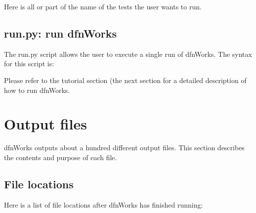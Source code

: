 \documentclass[letterpaper,10pt,english]{sphinxmanual}
\begin{document}

Here  is all or part of the name of the tests the user wants to run.


\section{run.py: run dfnWorks}
\label{\detokenize{scripts:run-py-run-dfnworks}}
The run.py script allows the user to execute a single run of dfnWorks. The syntax for this script is:


Please refer to the tutorial section (the next section for a detailed description of how to run dfnWorks.


\chapter{Output files}
\label{\detokenize{output:output-files}}\label{\detokenize{output::doc}}
dfnWorks outputs about a hundred different output files. This section describes the contents and purpose of each file.


\section{File locations}
\label{\detokenize{output:file-locations}}
Here is a list of file locations after dfnWorks has finished running:
\end{document}
